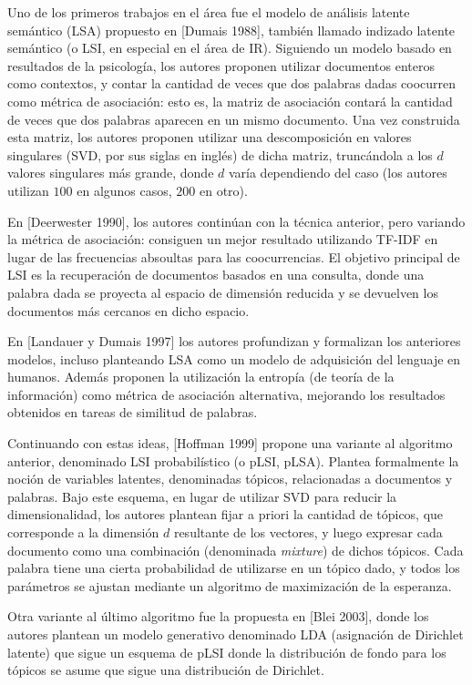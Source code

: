 Uno de los primeros trabajos en el área fue el modelo de análisis latente semántico (LSA) propuesto
en [Dumais 1988], también llamado indizado latente semántico (o LSI, en especial en el área de
IR). Siguiendo un modelo basado en resultados de la psicología, los autores proponen utilizar
documentos enteros como contextos, y contar la cantidad de veces que dos palabras dadas coocurren
como métrica de asociación: esto es, la matriz de asociación contará la cantidad de veces que dos
palabras aparecen en un mismo documento. Una vez construida esta matriz, los autores proponen
utilizar una descomposición en valores singulares (SVD, por sus siglas en inglés) de dicha matriz,
truncándola a los $d$ valores singulares más grande, donde $d$ varía dependiendo del caso (los
autores utilizan $100$ en algunos casos, $200$ en otro).

En [Deerwester 1990], los autores continúan con la técnica anterior, pero variando la métrica de
asociación: consiguen un mejor resultado utilizando TF-IDF en lugar de las frecuencias absoultas
para las coocurrencias. El objetivo principal de LSI es la recuperación de documentos basados en una
consulta, donde una palabra dada se proyecta al espacio de dimensión reducida y se devuelven los
documentos más cercanos en dicho espacio.

En [Landauer y Dumais 1997] los autores profundizan y formalizan los anteriores modelos, incluso
planteando LSA como un modelo de adquisición del lenguaje en humanos. Además proponen la utilización
la entropía (de teoría de la información) como métrica de asociación alternativa, mejorando los
resultados obtenidos en tareas de similitud de palabras.

Continuando con estas ideas, [Hoffman 1999] propone una variante al algoritmo anterior, denominado
LSI probabilístico (o pLSI, pLSA). Plantea formalmente la noción de variables latentes, denominadas
tópicos, relacionadas a documentos y palabras. Bajo este esquema, en lugar de utilizar SVD para
reducir la dimensionalidad, los autores plantean fijar a priori la cantidad de tópicos, que
corresponde a la dimensión $d$ resultante de los vectores, y luego expresar cada documento como una
combinación (denominada \textit{mixture}) de dichos tópicos. Cada palabra tiene una cierta
probabilidad de utilizarse en un tópico dado, y todos los parámetros se ajustan mediante un
algoritmo de maximización de la esperanza.

Otra variante al último algoritmo fue la propuesta en [Blei 2003], donde los autores plantean un
modelo generativo denominado LDA (asignación de Dirichlet latente) que sigue un esquema de pLSI
donde la distribución de fondo para los tópicos se asume que sigue una distribución de Dirichlet.


